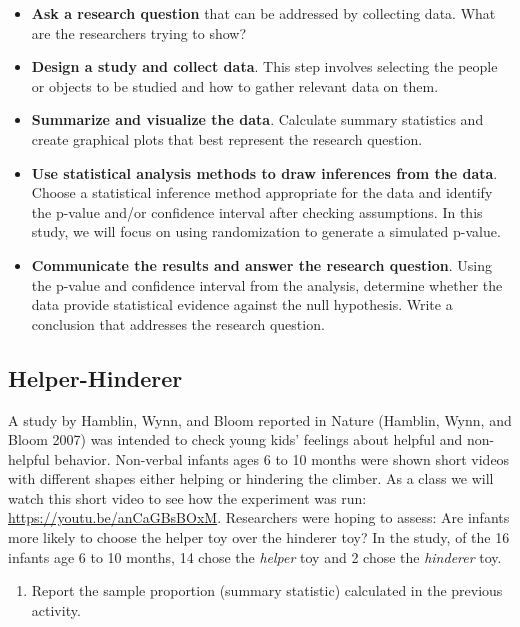 \documentclass[
]{report}
\providecommand{\tightlist}{%
  \setlength{\itemsep}{0pt}\setlength{\parskip}{0pt}}
\begin{document}
\begin{itemize}
\item
  \textbf{Ask a research question} that can be addressed by collecting data. What are the researchers trying to show?
\item
  \textbf{Design a study and collect data}. This step involves selecting the people or objects to be studied and how to gather relevant data on them.
\item
  \textbf{Summarize and visualize the data}. Calculate summary statistics and create graphical plots that best represent the research question.
\item
  \textbf{Use statistical analysis methods to draw inferences from the data}. Choose a statistical inference method appropriate for the data and identify the p-value and/or confidence interval after checking assumptions. In this study, we will focus on using randomization to generate a simulated p-value.
\item
  \textbf{Communicate the results and answer the research question}. Using the p-value and confidence interval from the analysis, determine whether the data provide statistical evidence against the null hypothesis. Write a conclusion that addresses the research question.
\end{itemize}

\subsection{Helper-Hinderer}\label{helper-hinderer-1}

A study by Hamblin, Wynn, and Bloom reported in Nature (Hamblin, Wynn, and Bloom 2007) was intended to check young kids' feelings about helpful and non-helpful behavior. Non-verbal infants ages 6 to 10 months were shown short videos with different shapes either helping or hindering the climber. As a class we will watch this short video to see how the experiment was run: \url{https://youtu.be/anCaGBsBOxM}. Researchers were hoping to assess: Are infants more likely to choose the helper toy over the hinderer toy? In the study, of the 16 infants age 6 to 10 months, 14 chose the \emph{helper} toy and 2 chose the \emph{hinderer} toy.

\begin{enumerate}
\def\labelenumi{\arabic{enumi}.}
\tightlist
\item
  Report the sample proportion (summary statistic) calculated in the previous activity.
\end{enumerate}
\end{document}
